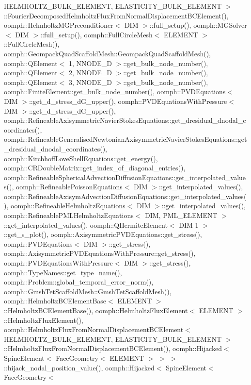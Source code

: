 H\+E\+L\+M\+H\+O\+L\+T\+Z\+\_\+\+B\+U\+L\+K\+\_\+\+E\+L\+E\+M\+E\+N\+T, E\+L\+A\+S\+T\+I\+C\+I\+T\+Y\+\_\+\+B\+U\+L\+K\+\_\+\+E\+L\+E\+M\+E\+N\+T $>$\+::\+Fourier\+Decomposed\+Helmholtz\+Flux\+From\+Normal\+Displacement\+B\+C\+Element(), oomph\+::\+Helmholtz\+M\+G\+Preconditioner$<$ D\+I\+M $>$\+::full\+\_\+setup(), oomph\+::\+M\+G\+Solver$<$ D\+I\+M $>$\+::full\+\_\+setup(), oomph\+::\+Full\+Circle\+Mesh$<$ E\+L\+E\+M\+E\+N\+T $>$\+::\+Full\+Circle\+Mesh(), oomph\+::\+Geompack\+Quad\+Scaffold\+Mesh\+::\+Geompack\+Quad\+Scaffold\+Mesh(), oomph\+::\+Q\+Element$<$ 1, N\+N\+O\+D\+E\+\_\+D $>$\+::get\+\_\+bulk\+\_\+node\+\_\+number(), oomph\+::\+Q\+Element$<$ 2, N\+N\+O\+D\+E\+\_\+D $>$\+::get\+\_\+bulk\+\_\+node\+\_\+number(), oomph\+::\+Q\+Element$<$ 3, N\+N\+O\+D\+E\+\_\+D $>$\+::get\+\_\+bulk\+\_\+node\+\_\+number(), oomph\+::\+Finite\+Element\+::get\+\_\+bulk\+\_\+node\+\_\+number(), oomph\+::\+P\+V\+D\+Equations$<$ D\+I\+M $>$\+::get\+\_\+d\+\_\+stress\+\_\+d\+G\+\_\+upper(), oomph\+::\+P\+V\+D\+Equations\+With\+Pressure$<$ D\+I\+M $>$\+::get\+\_\+d\+\_\+stress\+\_\+d\+G\+\_\+upper(), oomph\+::\+Refineable\+Axisymmetric\+Navier\+Stokes\+Equations\+::get\+\_\+dresidual\+\_\+dnodal\+\_\+coordinates(), oomph\+::\+Refineable\+Generalised\+Newtonian\+Axisymmetric\+Navier\+Stokes\+Equations\+::get\+\_\+dresidual\+\_\+dnodal\+\_\+coordinates(), oomph\+::\+Kirchhoff\+Love\+Shell\+Equations\+::get\+\_\+energy(), oomph\+::\+C\+R\+Double\+Matrix\+::get\+\_\+index\+\_\+of\+\_\+diagonal\+\_\+entries(), oomph\+::\+Refineable\+Spherical\+Advection\+Diffusion\+Equations\+::get\+\_\+interpolated\+\_\+values(), oomph\+::\+Refineable\+Poisson\+Equations$<$ D\+I\+M $>$\+::get\+\_\+interpolated\+\_\+values(), oomph\+::\+Refineable\+Axisym\+Advection\+Diffusion\+Equations\+::get\+\_\+interpolated\+\_\+values(), oomph\+::\+Refineable\+Helmholtz\+Equations$<$ D\+I\+M $>$\+::get\+\_\+interpolated\+\_\+values(), oomph\+::\+Refineable\+P\+M\+L\+Helmholtz\+Equations$<$ D\+I\+M, P\+M\+L\+\_\+\+E\+L\+E\+M\+E\+N\+T $>$\+::get\+\_\+interpolated\+\_\+values(), oomph\+::\+Q\+Hermite\+Element$<$ D\+I\+M-\/1 $>$\+::get\+\_\+s\+\_\+plot(), oomph\+::\+Axisymmetric\+P\+V\+D\+Equations\+::get\+\_\+stress(), oomph\+::\+P\+V\+D\+Equations$<$ D\+I\+M $>$\+::get\+\_\+stress(), oomph\+::\+Axisymmetric\+P\+V\+D\+Equations\+With\+Pressure\+::get\+\_\+stress(), oomph\+::\+P\+V\+D\+Equations\+With\+Pressure$<$ D\+I\+M $>$\+::get\+\_\+stress(), oomph\+::\+Type\+Names\+::get\+\_\+type\+\_\+name(), oomph\+::\+Problem\+::global\+\_\+temporal\+\_\+error\+\_\+norm(), oomph\+::\+Gmsh\+Tet\+Scaffold\+Mesh\+::\+Gmsh\+Tet\+Scaffold\+Mesh(), oomph\+::\+Helmholtz\+B\+C\+Element\+Base$<$ E\+L\+E\+M\+E\+N\+T $>$\+::\+Helmholtz\+B\+C\+Element\+Base(), oomph\+::\+Helmholtz\+Flux\+Element$<$ E\+L\+E\+M\+E\+N\+T $>$\+::\+Helmholtz\+Flux\+Element(), oomph\+::\+Helmholtz\+Flux\+From\+Normal\+Displacement\+B\+C\+Element$<$ H\+E\+L\+M\+H\+O\+L\+T\+Z\+\_\+\+B\+U\+L\+K\+\_\+\+E\+L\+E\+M\+E\+N\+T, E\+L\+A\+S\+T\+I\+C\+I\+T\+Y\+\_\+\+B\+U\+L\+K\+\_\+\+E\+L\+E\+M\+E\+N\+T $>$\+::\+Helmholtz\+Flux\+From\+Normal\+Displacement\+B\+C\+Element(), oomph\+::\+Hijacked$<$ Spine\+Element$<$ Face\+Geometry$<$ E\+L\+E\+M\+E\+N\+T $>$ $>$ $>$\+::hijack\+\_\+nodal\+\_\+position\+\_\+value(), oomph\+::\+Hijacked$<$ Spine\+Element$<$ Face\+Geometry$<$ 
